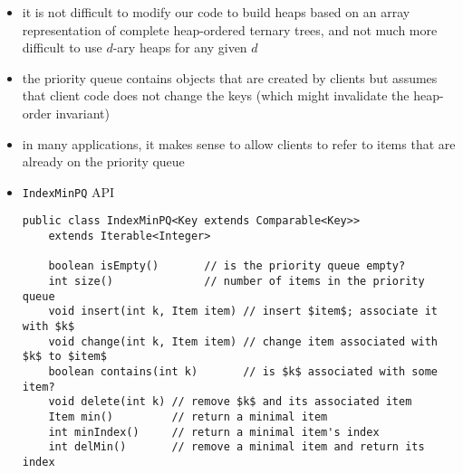 \documentclass[8pt,a4paper,compress]{beamer}
\begin{document}
\begin{frame}[fragile]
\begin{itemize}
\item it is not difficult to modify our code to
build heaps based on an array representation of complete heap-ordered ternary trees, and not much more difficult to use $d$-ary heaps for any given $d$

\item the priority queue contains objects that are created by clients but assumes that client code does not change the keys (which might invalidate the heap-order invariant)

\item in many applications, it makes sense to allow clients to refer to items that are already on the priority queue 
\item \lstinline{IndexMinPQ} API
\begin{lstlisting}[language={},mathescape]
public class IndexMinPQ<Key extends Comparable<Key>> 
    extends Iterable<Integer>

    boolean isEmpty()       // is the priority queue empty?
    int size()              // number of items in the priority queue
    void insert(int k, Item item) // insert $item$; associate it with $k$
    void change(int k, Item item) // change item associated with $k$ to $item$
    boolean contains(int k)       // is $k$ associated with some item?
    void delete(int k) // remove $k$ and its associated item
    Item min()         // return a minimal item
    int minIndex()     // return a minimal item's index
    int delMin()       // remove a minimal item and return its index
\end{lstlisting}
\end{itemize}
\end{frame}
\end{document}
